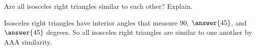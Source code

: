 \documentclass[nooutcomes]{ximera}
\begin{document}
\begin{question}Are all isosceles right triangles similar to each other? 
 Explain.  
\begin{question}
Isosceles right triangles have interior angles that measure $90$, $\answer{45}$, and $\answer{45}$ degrees.  So all isosceles right triangles are similar to one another by AAA similarity.  
\end{question}
\end{question}
\end{document}
